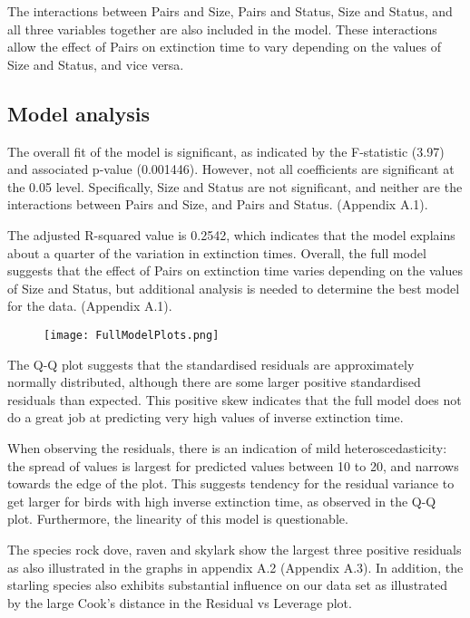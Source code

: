 \documentclass[a4paper, 12pt]{article}
\begin{document}
\begin{spacing}{1.5}
The interactions between Pairs and Size, Pairs and Status, Size and Status, and all three variables together are also included in the model. These interactions allow the effect of Pairs on extinction time to vary depending on the values of Size and Status, and vice versa.

\subsection{Model analysis}
The overall fit of the model is significant, as indicated by the F-statistic (3.97) and associated p-value (0.001446). However, not all coefficients are significant at the 0.05 level. Specifically, Size and Status are not significant, and neither are the interactions between Pairs and Size, and Pairs and Status. (Appendix A.1).

The adjusted R-squared value is 0.2542, which indicates that the model explains about a quarter of the variation in extinction times. Overall, the full model suggests that the effect of Pairs on extinction time varies depending on the values of Size and Status, but additional analysis is needed to determine the best model for the data. (Appendix A.1).

\begin{figure}[h]
    \texttt{[image: FullModelPlots.png]}
\end{figure}
\vspace{-7mm}
\begin{center}
\end{center}

The Q-Q plot suggests that the standardised residuals are approximately normally
distributed, although there are some larger positive standardised residuals than
expected. This positive skew indicates that the full model does not do a great job at predicting very high values of inverse extinction time.

When observing the residuals, there is an indication of mild heteroscedasticity: the spread of values is largest for predicted values between 10 to 20, and narrows towards the edge of the plot. This suggests tendency for the residual variance to get larger for birds with high inverse extinction time, as observed in the Q-Q plot. Furthermore, the linearity of this model is questionable.

The species rock dove, raven and skylark show the largest three positive residuals as also illustrated in the graphs in appendix A.2 (Appendix A.3). In addition, the starling species also exhibits substantial influence on our data set as illustrated by the large Cook's distance in the Residual vs Leverage plot. 


\end{spacing}
\end{document}
